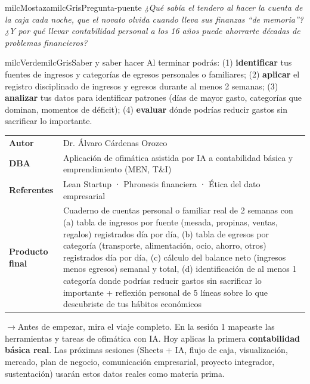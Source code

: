 \documentclass[11pt,letterpaper]{article}
\newcommand{\puente}[1]{%
  \begin{puentebox}%
    \textcolor{milcGradeDark}{$\rightarrow$}\hspace{2mm}#1%
  \end{puentebox}%
}
\begin{document}
\begin{softbox}{milcMostaza}{milcGris}{Pregunta-puente}
\textit{¿Qué sabía el tendero al hacer la cuenta de la caja cada noche, que el novato olvida cuando lleva sus finanzas \emph{``de memoria''}? ¿Y por qué llevar contabilidad personal a los 16 años puede ahorrarte décadas de problemas financieros?}
\end{softbox}

\begin{softbox}{milcVerde}{milcGris}{Saber y saber hacer}
Al terminar podrás: (1) \textbf{identificar} tus fuentes de ingresos y categorías de egresos personales o familiares; (2) \textbf{aplicar} el registro disciplinado de ingresos y egresos durante al menos 2 semanas; (3) \textbf{analizar} tus datos para identificar patrones (días de mayor gasto, categorías que dominan, momentos de déficit); (4) \textbf{evaluar} dónde podrías reducir gastos sin sacrificar lo importante.
\end{softbox}



\small
\begin{tabularx}{\textwidth}{>{\bfseries}p{3.0cm}Y}
Autor & Dr. Álvaro Cárdenas Orozco\\
DBA & Aplicación de ofimática asistida por IA a contabilidad básica y emprendimiento (MEN, T\&I)\\
Referentes & Lean Startup · Phronesis financiera · Ética del dato empresarial\\
Producto final & Cuaderno de cuentas personal o familiar real de 2 semanas con (a) tabla de ingresos por fuente (mesada, propinas, ventas, regalos) registrados día por día, (b) tabla de egresos por categoría (transporte, alimentación, ocio, ahorro, otros) registrados día por día, (c) cálculo del balance neto (ingresos menos egresos) semanal y total, (d) identificación de al menos 1 categoría donde podrías reducir gastos sin sacrificar lo importante + reflexión personal de 5 líneas sobre lo que descubriste de tus hábitos económicos\\
\end{tabularx}
\normalsize

\puente{Antes de empezar, mira el viaje completo. En la sesión 1 mapeaste las herramientas y tareas de ofimática con IA. Hoy aplicas la primera \textbf{contabilidad básica real}. Las próximas sesiones (Sheets + IA, flujo de caja, visualización, mercado, plan de negocio, comunicación empresarial, proyecto integrador, sustentación) usarán estos datos reales como materia prima.}
\end{document}

